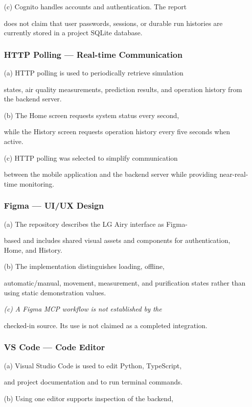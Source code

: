 \documentclass[conference]{IEEEtran}
\begin{document}
(c) Cognito handles accounts and authentication. The report

does not claim that user passwords, sessions, or durable run histories are currently stored in a project SQLite database.

\subsubsection{HTTP Polling --- Real-time Communication}

(a) HTTP polling is used to periodically retrieve simulation

states, air quality measurements, prediction results, and operation history from the backend server.

(b) The Home screen requests system status every second,

while the History screen requests operation history every five seconds when active.

(c) HTTP polling was selected to simplify communication

between the mobile application and the backend server while providing near-real-time monitoring.

\subsubsection{Figma --- UI/UX Design}

(a) The repository describes the LG Airy interface as Figma-

based and includes shared visual assets and components for authentication, Home, and History.

(b) The implementation distinguishes loading, offline,

automatic/manual, movement, measurement, and purification states rather than using static demonstration values.

\emph{(c) A Figma MCP workflow is not established by the}

checked-in source. Its use is not claimed as a completed integration.

\subsubsection{VS Code --- Code Editor}

(a) Visual Studio Code is used to edit Python, TypeScript,

and project documentation and to run terminal commands.

(b) Using one editor supports inspection of the backend,
\end{document}
